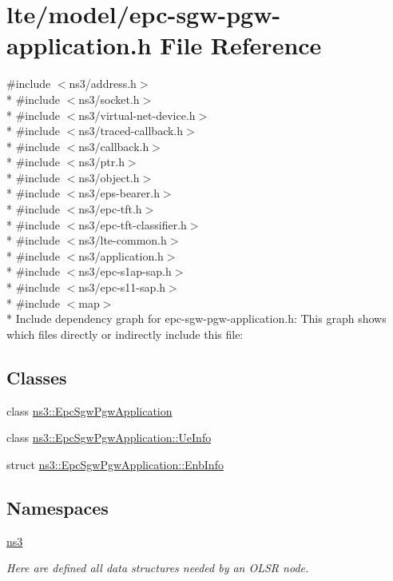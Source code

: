 \hypertarget{epc-sgw-pgw-application_8h}{}\section{lte/model/epc-\/sgw-\/pgw-\/application.h File Reference}
\label{epc-sgw-pgw-application_8h}
{\ttfamily \#include $<$ns3/address.\+h$>$}\\*
{\ttfamily \#include $<$ns3/socket.\+h$>$}\\*
{\ttfamily \#include $<$ns3/virtual-\/net-\/device.\+h$>$}\\*
{\ttfamily \#include $<$ns3/traced-\/callback.\+h$>$}\\*
{\ttfamily \#include $<$ns3/callback.\+h$>$}\\*
{\ttfamily \#include $<$ns3/ptr.\+h$>$}\\*
{\ttfamily \#include $<$ns3/object.\+h$>$}\\*
{\ttfamily \#include $<$ns3/eps-\/bearer.\+h$>$}\\*
{\ttfamily \#include $<$ns3/epc-\/tft.\+h$>$}\\*
{\ttfamily \#include $<$ns3/epc-\/tft-\/classifier.\+h$>$}\\*
{\ttfamily \#include $<$ns3/lte-\/common.\+h$>$}\\*
{\ttfamily \#include $<$ns3/application.\+h$>$}\\*
{\ttfamily \#include $<$ns3/epc-\/s1ap-\/sap.\+h$>$}\\*
{\ttfamily \#include $<$ns3/epc-\/s11-\/sap.\+h$>$}\\*
{\ttfamily \#include $<$map$>$}\\*
Include dependency graph for epc-\/sgw-\/pgw-\/application.h\+:
This graph shows which files directly or indirectly include this file\+:
\subsection*{Classes}
\begin{DoxyCompactItemize}
\item 
class \hyperlink{classns3_1_1EpcSgwPgwApplication}{ns3\+::\+Epc\+Sgw\+Pgw\+Application}
\item 
class \hyperlink{classns3_1_1EpcSgwPgwApplication_1_1UeInfo}{ns3\+::\+Epc\+Sgw\+Pgw\+Application\+::\+Ue\+Info}
\item 
struct \hyperlink{structns3_1_1EpcSgwPgwApplication_1_1EnbInfo}{ns3\+::\+Epc\+Sgw\+Pgw\+Application\+::\+Enb\+Info}
\end{DoxyCompactItemize}
\subsection*{Namespaces}
\begin{DoxyCompactItemize}
\item 
 \hyperlink{namespacens3}{ns3}
\begin{DoxyCompactList}\small\item\em Here are defined all data structures needed by an O\+L\+SR node. \end{DoxyCompactList}\end{DoxyCompactItemize}
